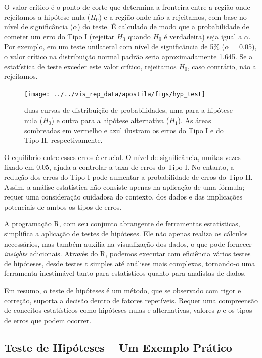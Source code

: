 \documentclass[article]{memoir}
\begin{document}
O valor crítico é o ponto de corte que determina a fronteira entre a região onde rejeitamos a hipótese nula ($H_0$) e a região onde não a rejeitamos, com base no nível de significância ($\alpha$) do teste. É calculado de modo que a probabilidade de cometer um erro do Tipo I (rejeitar $H_0$ quando $H_0$ é verdadeira) seja igual a $\alpha$. Por exemplo, em um teste unilateral com nível de significância de 5\% ($\alpha$ = 0.05), o valor crítico na distribuição normal padrão seria aproximadamente 1.645. Se a estatística de teste exceder este valor crítico, rejeitamos $H_0$, caso contrário, não a rejeitamos.


\begin{figure}[ht]
	\centering
	\texttt{[image: ../../vis\_rep\_data/apostila/figs/hyp\_test]}
	\caption{duas curvas de distribuição de probabilidades, uma para a hipótese nula ($H_0$) e outra para a hipótese alternativa ($H_1$). As áreas sombreadas em vermelho e azul ilustram os erros do Tipo I e do Tipo II, respectivamente.}
	\label{fig:hyptest}
\end{figure}


O equilíbrio entre esses erros é crucial. O nível de significância, muitas vezes fixado em 0,05, ajuda a controlar a taxa de erros do Tipo I. No entanto, a redução dos erros do Tipo I pode aumentar a probabilidade de erros do Tipo II. Assim, a análise estatística não consiste apenas na aplicação de uma fórmula; requer uma consideração cuidadosa do contexto, dos dados e das implicações potenciais de ambos os tipos de erros.

A programação R, com seu conjunto abrangente de ferramentas estatísticas, simplifica a aplicação de testes de hipóteses. Ele não apenas realiza os cálculos necessários, mas também auxilia na visualização dos dados, o que pode fornecer \textit{insights} adicionais. Através do R, podemos executar com eficiência vários testes de hipóteses, desde testes t simples até análises mais complexas, tornando-o uma ferramenta inestimável tanto para estatísticos quanto para analistas de dados.

Em resumo, o teste de hipóteses é um método, que se observado com rigor e correção, suporta a decisão dentro de fatores repetíveis. Requer uma compreensão de conceitos estatísticos como hipóteses nulas e alternativas, valores $p$ e os tipos de erros que podem ocorrer. 

\subsection{Teste de Hipóteses -- Um Exemplo Prático}
\end{document}
